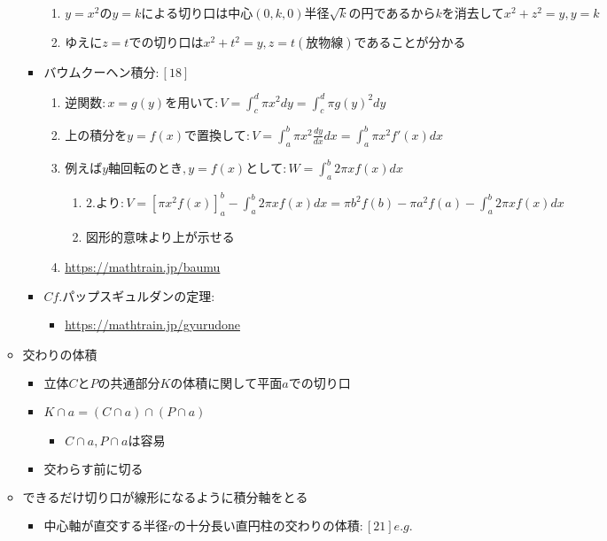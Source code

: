 \documentclass[dvipdfmx,uplatex]{jsarticle}
\begin{document}
\begin{itemize}
\begin{itemize}
\begin{itemize}
			\begin{enumerate}
				\item $ y=x^2のy=kによる切り口は中心(0,k,0)半径 \sqrt{k}の円であるからkを消去してx^2+z^2=y,y=k$
				\item $ ゆえにz=tでの切り口はx^2+t^2=y,z=t(放物線)であることが分かる$
			\end{enumerate}
			\item $ バウムクーヘン積分:[18] $
			\begin{enumerate}
				\item $ 逆関数:x=g(y)を用いて:V= \int^d_c \pi x^2 dy = \int^d_c \pi g(y)^2 dy$
				\item $ 上の積分をy=f(x)で置換して:V= \int^b_a \pi x^2 \frac{dy}{dx} dx = \int^b_a \pi x^2 f'(x)dx$
				\item $ 例えばy軸回転のとき,y = f(x)として:W = \int^b_a 2\pi xf(x)dx$
				\begin{enumerate}
					\item $ 2.より:V = [\pi x^2 f(x)]^b_a - \int^b_a 2 \pi xf(x)dx = \pi b^2 f(b) - \pi a^2 f(a) - \int^b_a 2 \pi xf(x)dx$
					\item 図形的意味より上が示せる
				\end{enumerate}
				\item \url{https://mathtrain.jp/baumu}
			\end{enumerate}
			\item $ Cf. パップスギュルダンの定理: $
			\begin{itemize}
				\item \url{https://mathtrain.jp/gyurudone}
			\end{itemize}
		\end{itemize}
		\item $ 交わりの体積$
		\begin{itemize}
			\item $ 立体CとPの共通部分Kの体積に関して平面aでの切り口$
			\item $ K \cap a = (C \cap a) \cap (P \cap a)$
			\begin{itemize}
				\item $ C \cap a, P \cap a は容易$
			\end{itemize}
			\item $ 交わらす前に切る$
		\end{itemize}
		\item $ できるだけ切り口が線形になるように積分軸をとる$
		\begin{itemize}
			\item $中心軸が直交する半径rの十分長い直円柱の交わりの体積:[21]e.g.$
		\end{itemize}
	\end{itemize}
\end{itemize}
\end{document}
